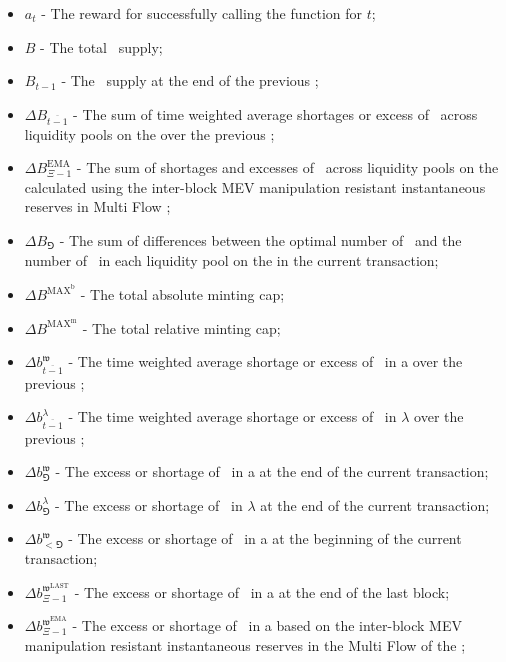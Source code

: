 \documentclass[class=article, crop=false]{standalone}
\begin{document}
\begin{itemize}[topsep=0pt, itemsep=2pt,leftmargin=16pt]
    \item[] $a_{t}$ - The reward for successfully calling the  function for $t$;
    \item[] $B$ - The total \Pinto\ supply;
    \item[] $B_{t-1}$ - The \Pinto\ supply at the end of the previous ;
    \item[] $\Delta B_{\overline{t-1}}$ - The sum of time weighted average shortages or excess of \Pinto\ across liquidity pools on the  over the previous ;
    \item[] $\Delta B_{\Xi-1}^{\text{EMA}}$ - The sum of shortages and excesses of \Pinto\ across liquidity pools on the  calculated using the inter-block MEV manipulation resistant instantaneous reserves in Multi Flow ;
    \item[] $\Delta B_{\Game}$ - The sum of differences between the optimal number of \Pinto\ and the number of \Pinto\ in each liquidity pool on the  in the current transaction;
    \item[] $\Delta B^{\text{MAX}^{\text{b}}}$ - The total absolute minting cap;
    \item[] $\Delta B^{\text{MAX}^{\text{m}}}$ - The total relative minting cap;
    \item[] $\Delta b_{\overline{t-1}}^{\mathfrak{w}}$ - The time weighted average shortage or excess of \Pinto\ in a  over the previous ;
    \item[] $\Delta b_{\overline{t-1}}^{\lambda}$ - The time weighted average shortage or excess of \Pinto\ in $\lambda$ over the previous ;
    \item[] $\Delta b_{\Game}^{\mathfrak{w}}$ - The excess or shortage of \Pinto\ in a  at the end of the current transaction;
    \item[] $\Delta b_{\Game}^{\lambda}$ - The excess or shortage of \Pinto\ in $\lambda$ at the end of the current transaction;
    \item[] $\Delta b_{<\Game}^{\mathfrak{w}}$ - The excess or shortage of \Pinto\ in a  at the beginning of the current transaction;
    \item[] $\Delta b_{\Xi-1}^{\mathfrak{w}^{\text{LAST}}}$ - The excess or shortage of \Pinto\ in a  at the end of the last block;
    \item[] $\Delta b_{\Xi-1}^{\mathfrak{w}^{\text{EMA}}}$ - The excess or shortage of \Pinto\ in a  based on the inter-block MEV manipulation resistant instantaneous reserves in the Multi Flow  of the ;

\end{itemize}
\end{document}
